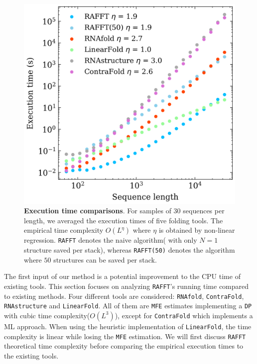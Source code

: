 \begin{figure}[t!]
	\centering
	\includegraphics[width=1.0\linewidth]{../res/images/rafft/time_tools.png}
	\caption{\label{Fig:time_comp}\textbf{Execution time comparisons}. For samples of $30$ sequences per length, we averaged the execution times of five folding tools. The empirical time complexity $O(L^\eta)$ where $\eta$ is obtained by non-linear regression. \texttt{RAFFT} denotes the naive algorithm( with only $N=1$ structure saved per stack), whereas \texttt{RAFFT(50)} denotes the algorithm where $50$ structures can be saved per stack.}
\end{figure}
The first input of our method is a potential improvement to the \ac{CPU} time of existing tools. This section focuses on analyzing \texttt{RAFFT}'s running time compared to existing methods. Four different tools are considered: \texttt{RNAfold}, \texttt{ContraFold}, \texttt{RNAstructure}  and \texttt{LinearFold}. All of them are \texttt{MFE} estimates implementing a \texttt{DP} with cubic time complexity($O(L^3)$), except for \texttt{ContraFold} which implements a ML approach. When using the heuristic implementation of \texttt{LinearFold}, the time complexity is linear while losing the \texttt{MFE} estimation. We will first discuss \texttt{RAFFT} theoretical time complexity before comparing the empirical execution times to the existing tools.

